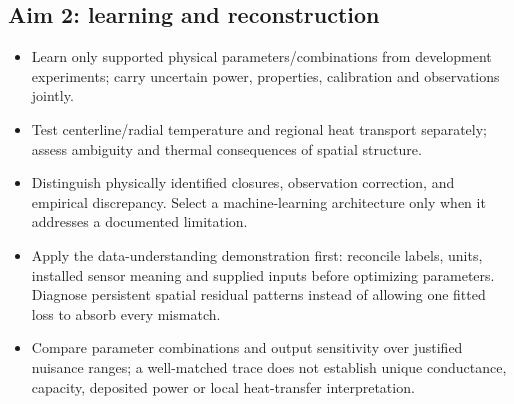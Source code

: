 \subsection{Aim 2: learning and reconstruction}\label{subsec:aim-2-learning-and-reconstruction}
\begin{itemize}[leftmargin=*]
\item Learn only supported physical parameters/\allowbreak{}combinations from development experiments; carry uncertain power, properties, calibration and observations jointly.
\item Test centerline/\allowbreak{}radial temperature and regional heat transport separately; assess ambiguity and thermal consequences of spatial structure.
\item Distinguish physically identified closures, observation correction, and empirical discrepancy. Select a machine-learning architecture only when it addresses a documented limitation.
\item Apply the data-understanding demonstration first: reconcile labels, units, installed sensor meaning and supplied inputs before optimizing parameters. Diagnose persistent spatial residual patterns instead of allowing one fitted loss to absorb every mismatch.
\item Compare parameter combinations and output sensitivity over justified nuisance ranges; a well-matched trace does not establish unique conductance, capacity, deposited power or local heat-transfer interpretation.\cite{raue2009identifiability}


\end{itemize}
